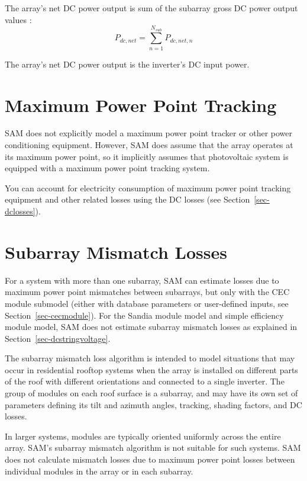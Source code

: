 \documentclass[12pt,letterpaper]{article}
\begin{document}
The array's net DC power output is sum of the subarray gross DC power output values :
\begin{equation}
P_{dc,net} = \sum_{n=1}^{N_{sub}} P_{dc,net,n}
\end{equation}

The array's net DC power output is the inverter's DC input power.

\section{Maximum Power Point Tracking}

SAM does not explicitly model a maximum power point tracker or other power conditioning equipment. However,  SAM does assume that the array operates at its maximum power point, so it implicitly assumes that photovoltaic system is equipped with a maximum power point tracking system. 

You can account for electricity consumption of maximum power point tracking equipment and other related losses using the DC losses (see Section~\ref{sec-dclosses}).

\section{Subarray Mismatch Losses}\label{sec-mismatch}

For a system with more than one subarray, SAM can estimate losses due to maximum power point mismatches between subarrays, but only with the CEC module submodel  (either with database parameters or user-defined inputs, see Section~\ref{sec-cecmodule}). For the Sandia module model and simple efficiency module model, SAM does not estimate subarray mismatch losses as explained in Section~\ref{sec-dcstringvoltage}.

The subarray mismatch loss algorithm \citep{dobos2012b} is intended to model situations that may occur in residential rooftop systems when the array is installed on different parts of the roof with different orientations and connected to a single inverter. The group of modules on each roof surface is a subarray, and may have its own set of parameters defining its tilt and azimuth angles, tracking, shading factors, and DC losses. 

In larger systems, modules are typically oriented uniformly across the entire array. SAM's subarray mismatch algorithm is not suitable for such systems. SAM does not calculate mismatch losses due to maximum power point losses between individual modules in the array or in each subarray.
\end{document}
